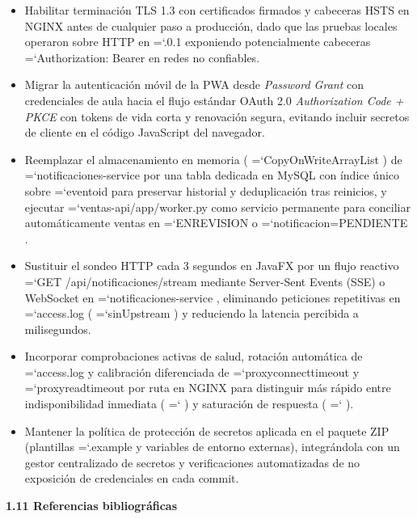 \documentclass[11pt,a4paper]{article}
\renewcommand{\_}{\oldunderscore\allowbreak}
\DeclareRobustCommand{\texttt}[1]{%
  {\upshape\ttfamily\fontsize{9}{10.8}\selectfont\hyphenchar\font=`\-\relax #1}%
}
\begin{document}
\begin{itemize}[leftmargin=*,itemsep=3pt,topsep=2pt]
  \item Habilitar terminación TLS 1.3 con certificados firmados y cabeceras HSTS en NGINX antes de cualquier paso a producción, dado que las pruebas locales operaron sobre HTTP en \texttt{127.0.0.1} exponiendo potencialmente cabeceras \texttt{Authorization: Bearer} en redes no confiables.
  \item Migrar la autenticación móvil de la PWA desde \textit{Password Grant} con credenciales de aula hacia el flujo estándar OAuth 2.0 \textit{Authorization Code + PKCE} con tokens de vida corta y renovación segura, evitando incluir secretos de cliente en el código JavaScript del navegador.
  \item Reemplazar el almacenamiento en memoria (\texttt{CopyOnWriteArrayList}) de \texttt{notificaciones-service} por una tabla dedicada en MySQL con índice único sobre \texttt{evento\_id} para preservar historial y deduplicación tras reinicios, y ejecutar \texttt{ventas-api/\allowbreak{}app/\allowbreak{}worker.\allowbreak{}py} como servicio permanente para conciliar automáticamente ventas en \texttt{EN\_REVISION} o \texttt{notificacion=\allowbreak{}PENDIENTE}.
  \item Sustituir el sondeo HTTP cada 3 segundos en JavaFX por un flujo reactivo \texttt{GET /\allowbreak{}api/\allowbreak{}notificaciones/\allowbreak{}stream} mediante Server-Sent Events (SSE) o WebSocket en \texttt{notificaciones-service}, eliminando peticiones repetitivas en \texttt{access.log} (\texttt{sinUpstream}) y reduciendo la latencia percibida a milisegundos.
  \item Incorporar comprobaciones activas de salud, rotación automática de \texttt{access.log} y calibración diferenciada de \texttt{proxy\_connect\_timeout} y \texttt{proxy\_read\_timeout} por ruta en NGINX para distinguir más rápido entre indisponibilidad inmediata (\texttt{502}) y saturación de respuesta (\texttt{504}).
  \item Mantener la política de protección de secretos aplicada en el paquete ZIP (plantillas \texttt{.example} y variables de entorno externas), integrándola con un gestor centralizado de secretos y verificaciones automatizadas de no exposición de credenciales en cada commit.
\end{itemize}

\vspace{0.2cm}

\noindent\textbf{1.11 Referencias bibliográficas}
\end{document}

